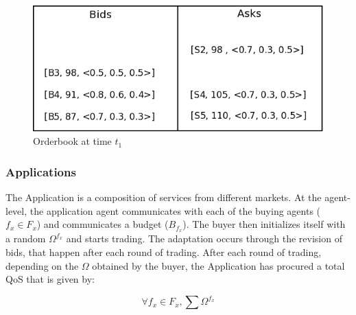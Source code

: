 \documentclass[10pt,journal,compsoc]{IEEEtran}
\begin{document}
\begin{figure}
\includegraphics[scale=0.31]{drawings/orderbook-after-one-pass.png}
\caption{Orderbook at time $t_{1}$}
\label{orderbook-after-one-pass}
\end{figure}


\subsubsection{Applications}
The Application is a composition of services from different markets. At the agent-level, the application agent communicates with each of the buying agents ($f_{x} \in F_{x}$) and communicates a budget ($B_{f_{x}}$). The buyer then initializes itself with a random $\Omega^{f_x}$ and starts trading. The adaptation occurs through the revision of bids, that happen after each round of trading. After each round of trading, depending on the $\Omega$ obtained by the buyer, the Application has procured a total QoS that is given by:
 
 	 \begin{equation}
	  \forall f_{x} \in F_{x}, \sum\Omega^{f_x} \label{eq:total_qa}
	 \end{equation}
\end{document}
